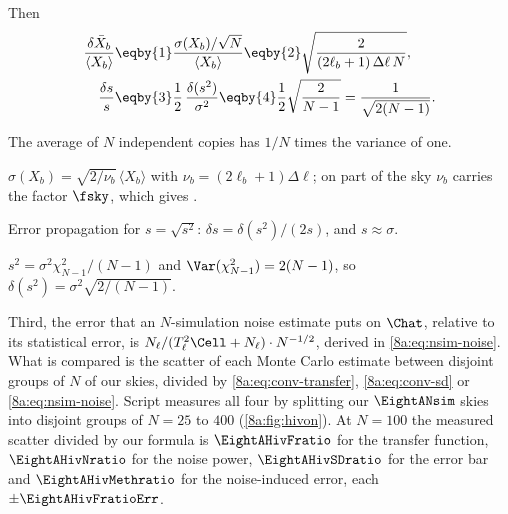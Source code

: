 Then
\begin{align}
  \frac{\delta\bar X_b}{\langle X_b\rangle}
  &\eqby{1}\frac{\sigma(X_b)/\sqrt N}{\langle X_b\rangle}
   \eqby{2}\sqrt{\frac{2}{(2\ell_b+1)\,\Delta\ell\,N}} ,
  \label{8a:eq:conv-transfer}\\
  \frac{\delta s}{s}
  &\eqby{3}\frac12\,\frac{\delta(s^2)}{\sigma^2}
   \eqby{4}\frac12\sqrt{\frac{2}{N-1}}
   =\frac{1}{\sqrt{2(N-1)}} .
  \label{8a:eq:conv-sd}
\end{align}
\begin{explain}
  \item The average of $N$ independent copies has $1/N$ times the variance of one.
  \item $\sigma(X_b)=\sqrt{2/\nu_b}\,\langle X_b\rangle$ with $\nu_b=(2\ell_b+1)\Delta\ell$; on part of
        the sky $\nu_b$ carries the factor $\fsky$, which gives .
  \item Error propagation for $s=\sqrt{s^2}$: $\delta s=\delta(s^2)/(2s)$, and $s\approx\sigma$.
  \item $s^2=\sigma^2\chi^2_{N-1}/(N-1)$ and $\Var(\chi^2_{N-1})=2(N-1)$, so
        $\delta(s^2)=\sigma^2\sqrt{2/(N-1)}$.
\end{explain}
Third, the error that an $N$-simulation noise estimate puts on $\Chat$, relative to its
statistical error, is $N_\ell/(T_\ell^2\Cell+N_\ell)\cdot N^{-1/2}$, derived in
\eqref{8a:eq:nsim-noise}. What is compared is the scatter of each Monte Carlo estimate between
disjoint groups of $N$ of our skies, divided by \eqref{8a:eq:conv-transfer},
\eqref{8a:eq:conv-sd} or \eqref{8a:eq:nsim-noise}. Script  measures all four by splitting
our $\EightANsim$ skies into disjoint groups of $N=25$ to $400$ (\cref{8a:fig:hivon}). At $N=100$ the
measured scatter divided by our formula is $\EightAHivFratio$ for the transfer function,
$\EightAHivNratio$ for the noise power, $\EightAHivSDratio$ for the error bar and
$\EightAHivMethratio$ for the noise-induced error, each $\pm\EightAHivFratioErr$.

